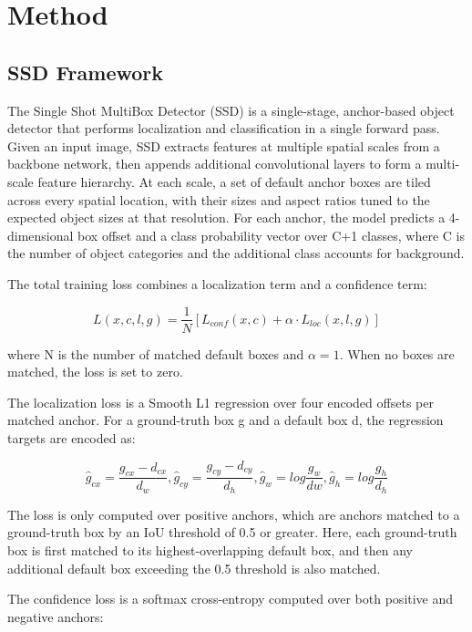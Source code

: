 \documentclass{article}
\begin{document}
\section{Method}
\label{sec:method}

\subsection{SSD Framework}

\qquad The Single Shot MultiBox Detector (SSD) is a single-stage, anchor-based object detector that performs localization and classification in a single forward pass. Given an input image, SSD extracts features at multiple spatial scales from a backbone network, then appends additional convolutional layers to form a multi-scale feature hierarchy. At each scale, a set of default anchor boxes are tiled across every spatial location, with their sizes and aspect ratios tuned to the expected object sizes at that resolution. For each anchor, the model predicts a 4-dimensional box offset and a class probability vector over C+1 classes, where C is the number of object categories and the additional class accounts for background.

\qquad The total training loss combines a localization term and a confidence term:

\[
L(x, c, l, g) = \frac{1}{N} [L_{conf}(x, c) + \alpha \cdot L_{loc}(x, l, g)]
\]

where N is the number of matched default boxes and $\alpha = 1$. When no boxes are matched, the loss is set to zero. 

\qquad The localization loss is a Smooth L1 regression over four encoded offsets per matched anchor. For a ground-truth box g and a default box d, the regression targets are encoded as:

\[
\hat{g}_{cx} = \frac{g_{cx} - d_{cx}}{d_{w}}, \hat{g}_{cy} = \frac{g_{cy} - d_{cy}}{d_{h}},
\hat{g}_{w} = log\frac{g_{w}}{d{w}},
\hat{g}_{h} = log\frac{g_{h}}{d_{h}}
\]

The loss is only computed over positive anchors, which are anchors matched to a ground-truth box by an IoU threshold of 0.5 or greater. Here, each ground-truth box is first matched to its highest-overlapping default box, and then any additional default box exceeding the 0.5 threshold is also matched.

\qquad The confidence loss is a softmax cross-entropy computed over both positive and negative anchors:
\end{document}

